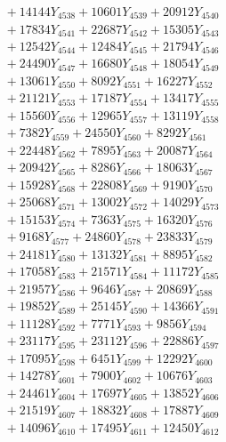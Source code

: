 \documentclass[a4paper,10pt]{article}
\begin{document}
{\begin{align}
&\;  + 14144 Y_{4538} + 10601 Y_{4539} + 20912 Y_{4540} \\[0.3ex]
&\;  + 17834 Y_{4541} + 22687 Y_{4542} + 15305 Y_{4543} \\[0.3ex]
&\;  + 12542 Y_{4544} + 12484 Y_{4545} + 21794 Y_{4546} \\[0.3ex]
&\;  + 24490 Y_{4547} + 16680 Y_{4548} + 18054 Y_{4549} \\[0.3ex]
&\;  + 13061 Y_{4550} + 8092 Y_{4551} + 16227 Y_{4552} \\[0.3ex]
&\;  + 21121 Y_{4553} + 17187 Y_{4554} + 13417 Y_{4555} \\[0.3ex]
&\;  + 15560 Y_{4556} + 12965 Y_{4557} + 13119 Y_{4558} \\[0.5ex]\allowbreak
&\;  + 7382 Y_{4559} + 24550 Y_{4560} + 8292 Y_{4561} \\[0.3ex]
&\;  + 22448 Y_{4562} + 7895 Y_{4563} + 20087 Y_{4564} \\[0.3ex]
&\;  + 20942 Y_{4565} + 8286 Y_{4566} + 18063 Y_{4567} \\[0.3ex]
&\;  + 15928 Y_{4568} + 22808 Y_{4569} + 9190 Y_{4570} \\[0.3ex]
&\;  + 25068 Y_{4571} + 13002 Y_{4572} + 14029 Y_{4573} \\[0.3ex]
&\;  + 15153 Y_{4574} + 7363 Y_{4575} + 16320 Y_{4576} \\[0.3ex]
&\;  + 9168 Y_{4577} + 24860 Y_{4578} + 23833 Y_{4579} \\[0.3ex]
&\;  + 24181 Y_{4580} + 13132 Y_{4581} + 8895 Y_{4582} \\[0.3ex]
&\;  + 17058 Y_{4583} + 21571 Y_{4584} + 11172 Y_{4585} \\[0.3ex]
&\;  + 21957 Y_{4586} + 9646 Y_{4587} + 20869 Y_{4588} \\[0.5ex]\allowbreak
&\;  + 19852 Y_{4589} + 25145 Y_{4590} + 14366 Y_{4591} \\[0.3ex]
&\;  + 11128 Y_{4592} + 7771 Y_{4593} + 9856 Y_{4594} \\[0.3ex]
&\;  + 23117 Y_{4595} + 23112 Y_{4596} + 22886 Y_{4597} \\[0.3ex]
&\;  + 17095 Y_{4598} + 6451 Y_{4599} + 12292 Y_{4600} \\[0.3ex]
&\;  + 14278 Y_{4601} + 7900 Y_{4602} + 10676 Y_{4603} \\[0.3ex]
&\;  + 24461 Y_{4604} + 17697 Y_{4605} + 13852 Y_{4606} \\[0.3ex]
&\;  + 21519 Y_{4607} + 18832 Y_{4608} + 17887 Y_{4609} \\[0.3ex]
&\;  + 14096 Y_{4610} + 17495 Y_{4611} + 12450 Y_{4612} \\[0.3ex]

\end{align}}
\end{document}
